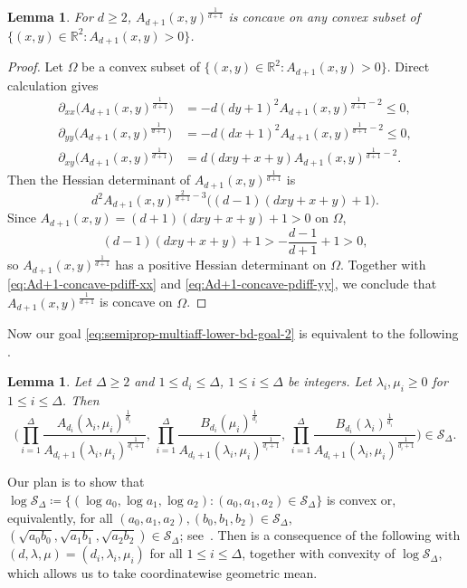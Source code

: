 \documentclass{article}
\numberwithin{equation}{section}
\theoremstyle{plain}
\newtheorem{lemma}[theorem]{Lemma}
\theoremstyle{definition}
\theoremstyle{remark} %
\newcommand{\defeq}{\coloneqq}
\newcommand{\RR}{\mathbb{R}}
\newcommand{\calS}{\mathcal{S}}
\begin{document}
\begin{lemma}\label{lem:Ad+1-concave}
	For \(d\ge2\), \(A_{d+1}(x,y)^{\frac{1}{d+1}}\) is concave on any convex subset of \(\{(x,y)\in\RR^2 : A_{d+1}(x,y)>0\}\).
\end{lemma}
\begin{proof}
    Let \(\Omega\) be a convex subset of \(\{(x,y)\in\RR^2 : A_{d+1}(x,y)>0\}\). Direct calculation gives
    \begin{align}
        \partial_{xx} \bigl( A_{d+1}(x,y)^{\frac{1}{d+1}} \bigr)
        &= -d(dy+1)^2 A_{d+1}(x,y)^{\frac{1}{d+1}-2} \le0,
        \label{eq:Ad+1-concave-pdiff-xx} \\
        \partial_{yy} \bigl( A_{d+1}(x,y)^{\frac{1}{d+1}} \bigr)
        &= -d(dx+1)^2 A_{d+1}(x,y)^{\frac{1}{d+1}-2} \le0,
        \label{eq:Ad+1-concave-pdiff-yy} \\
        \partial_{xy} \bigl( A_{d+1}(x,y)^{\frac{1}{d+1}} \bigr)
        &= d(dxy+x+y) A_{d+1}(x,y)^{\frac{1}{d+1}-2}. \nonumber
    \end{align}
    Then the Hessian determinant of \(A_{d+1}(x,y)^{\frac{1}{d+1}}\) is
    \[
        d^2 A_{d+1}(x,y)^{\frac{2}{d+1}-3} \bigl( (d-1)(dxy+x+y) + 1 \bigr).
    \]
    Since \(A_{d+1}(x,y) = (d+1)(dxy+x+y)+1 > 0\) on \(\Omega\),
    \[
        (d-1)(dxy+x+y) + 1 > -\frac{d-1}{d+1} + 1 > 0,
    \]
    so \(A_{d+1}(x,y)^{\frac{1}{d+1}}\) has a positive Hessian determinant on \(\Omega\). Together with \eqref{eq:Ad+1-concave-pdiff-xx} and \eqref{eq:Ad+1-concave-pdiff-yy}, we conclude that \(A_{d+1}(x,y)^{\frac{1}{d+1}}\) is concave on \(\Omega\).
\end{proof}

Now our goal \eqref{eq:semiprop-multiaff-lower-bd-goal-2} is equivalent to the following .
\begin{lemma}\label{lem:Sn-membership}
    Let \(\Delta\ge2\) and \(1\le d_i\le \Delta\), \(1\le i\le \Delta\) be integers. Let \(\lambda_i,\mu_i\ge0\) for \(1\le i\le \Delta\). Then
    \[
        \biggl(
        \prod_{i=1}^\Delta \frac{A_{d_i}(\lambda_i,\mu_i)^{\frac{1}{d_i}}}{A_{d_i+1}(\lambda_i,\mu_i)^{\frac{1}{d_i+1}}},\,
        \prod_{i=1}^\Delta \frac{B_{d_i}(\mu_i)^{\frac{1}{d_i}}}{A_{d_i+1}(\lambda_i,\mu_i)^{\frac{1}{d_i+1}}},\,
        \prod_{i=1}^\Delta \frac{B_{d_i}(\lambda_i)^{\frac{1}{d_i}}}{A_{d_i+1}(\lambda_i,\mu_i)^{\frac{1}{d_i+1}}}
        \biggr) \in \calS_\Delta.
    \]
\end{lemma}

Our plan is to show that \(\log\calS_\Delta \defeq \{(\log a_0,\log a_1,\log a_2):(a_0,a_1,a_2)\in \calS_\Delta\}\) is convex or, equivalently, for all \((a_0,a_1,a_2), (b_0,b_1,b_2)\in \calS_\Delta\), $( \sqrt{a_0 b_0}, \sqrt{a_1 b_1}, \sqrt{a_2 b_2}) \in \calS_\Delta$; see~.
Then  is a consequence of the following  with \((d,\lambda,\mu) = (d_i,\lambda_i,\mu_i)\) for all \(1\le i\le \Delta\), together with convexity of \(\log\calS_\Delta\), which allows us to take coordinatewise geometric mean.
\end{document}
